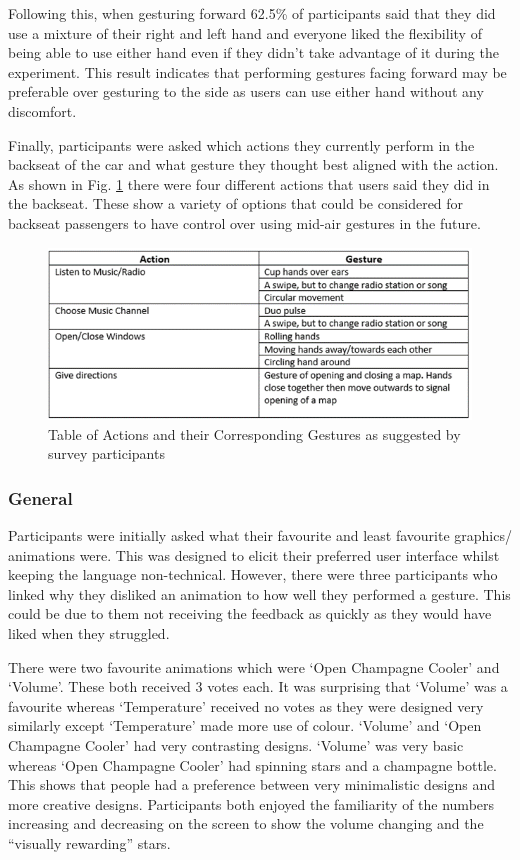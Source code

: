\documentclass{l4proj}
\begin{document}
Following this, when gesturing forward 62.5\% of participants said that they did use a mixture of their right and left hand and everyone liked the flexibility of being able to use either hand even if they didn’t take advantage of it during the experiment. This result indicates that performing gestures facing forward may be preferable over gesturing to the side as users can use either hand without any discomfort. 

Finally, participants were asked which actions they currently perform in the backseat of the car and what gesture they thought best aligned with the action. As shown in Fig. \ref{fig:backseatGestures} there were four different actions that users said they did in the backseat. These show a variety of options that could be considered for backseat passengers to have control over using mid-air gestures in the future.

\begin{figure}[!htb]
    \centering
    \includegraphics[scale = 0.8]{images/backseatGestures.png}
    \caption{Table of Actions and their Corresponding Gestures as suggested by survey participants}
    \label{fig:backseatGestures}
\end{figure}

\subsubsection{General}
Participants were initially asked what their favourite and least favourite graphics/ animations were. 
This was designed to elicit their preferred user interface whilst keeping the language non-technical. However, there were three participants who linked why they disliked an animation to how well they performed a gesture. This could be due to them not receiving the feedback as quickly as they would have liked when they struggled.

There were two favourite animations which were ‘Open Champagne Cooler’ and ‘Volume’. These both received 3 votes each. It was surprising that ‘Volume’ was a favourite whereas ‘Temperature’ received no votes as they were designed very similarly except ‘Temperature’ made more use of colour. ‘Volume’ and ‘Open Champagne Cooler’ had very contrasting designs. ‘Volume’ was very basic whereas ‘Open Champagne Cooler’ had spinning stars and a champagne bottle. This shows that people had a preference between very minimalistic designs and more creative designs. Participants both enjoyed the familiarity of the numbers increasing and decreasing on the screen to show the volume changing and the “visually rewarding” stars. 
\end{document}
